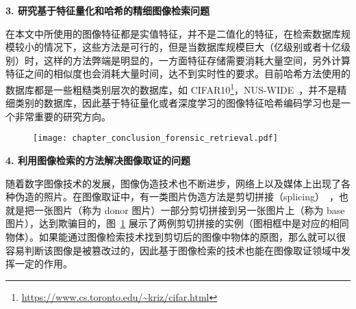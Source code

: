 \textbf{3. 研究基于特征量化和哈希的精细图像检索问题}

在本文中所使用的图像特征都是实值特征，并不是二值化的特征，在检索数据库规模较小的情况下，这些方法是可行的，但是当数据库规模巨大（亿级别或者十亿级别）时，这样的方法弊端是明显的，一方面特征存储需要消耗大量空间，另外计算特征之间的相似度也会消耗大量时间，达不到实时性的要求。目前哈希方法使用的数据库都是一些粗糙类别层次的数据库，如 CIFAR10\footnote{\url{https://www.cs.toronto.edu/~kriz/cifar.html}}，NUS-WIDE~\cite{Chua2009NUSWIDEAR}，并不是精细类别的数据库，因此基于特征量化或者深度学习的图像特征哈希编码学习也是一个非常重要的研究方向。

\begin{figure}[!t]
\centering
\texttt{[image: chapter\_conclusion\_forensic\_retrieval.pdf]}
\label{fig:forensic_image_retrieval}
\end{figure}

\textbf{4. 利用图像检索的方法解决图像取证的问题}

随着数字图像技术的发展，图像伪造技术也不断进步，网络上以及媒体上出现了各种伪造的照片。在图像取证中，有一类图片伪造方法是剪切拼接（splicing）~\cite{Farid2009ImageFD,Cozzolino2015SplicebusterAN,Iuliani2015ImageSD}，也就是把一张图片（称为 donor 图片）一部分剪切拼接到另一张图片上（称为 base 图片），达到欺骗目的，图~\ref{fig:forensic_image_retrieval} 展示了两例剪切拼接的实例（图相框中是对应的相同物体）。如果能通过图像检索技术找到剪切后的图像中物体的原图，那么就可以很容易判断该图像是被篡改过的，因此基于图像检索的技术也能在图像取证领域中发挥一定的作用。





